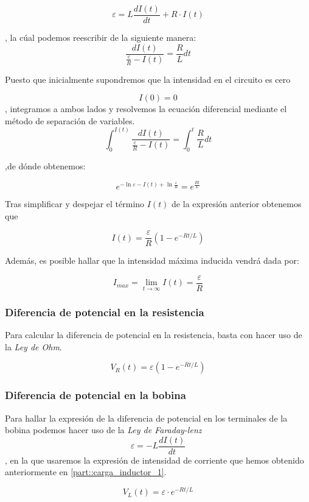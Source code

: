 \documentclass[../main.tex]{subfiles}
\begin{document}
$$\varepsilon = L\frac{d I(t)}{d t} + R \cdot I(t)$$

, la cúal podemos reescribir de la siguiente manera:
$$\frac{d I(t)}{\frac{\varepsilon}{R} - I(t)} = \frac{R}{L} d t$$


Puesto que inicialmente supondremos que la intensidad en el circuito es cero

$$I(0) = 0$$
, integramos a ambos lados y resolvemos la ecuación diferencial mediante el método de separación de variables.
$$\int_0^{I(t)} \frac{d I(t)}{\frac{\varepsilon}{R} - I(t)} = \int_0^t  \frac{R}{L} d t$$

,de dónde obtenemos:

$$e^{-\ln{\varepsilon - I(t)} + \ln{\frac{\varepsilon}{R}}} = e^{\frac{Rt}{L}}$$

Tras simplificar y despejar el término $I(t)$ de la expresión anterior obtenemos que

\begin{equation}
    I(t) = \frac{\varepsilon}{R}\left( 1- e^{-Rt/L}\right)
\end{equation}

Además, es posible hallar que la intensidad máxima inducida vendrá dada por:

$$I_{max} = \lim_{t \to \infty} I(t) = \frac{\varepsilon}{R}$$


\subsubsection{Diferencia de potencial en la resistencia}
\label{part::carga_inductor_2}
Para calcular la diferencia de potencial en la resistencia, basta con hacer uso de la \textit{Ley de Ohm}.

\begin{equation}
    V_R(t) = \varepsilon \left( 1 - e^{-Rt/L}\right)
\end{equation}


\subsubsection{Diferencia de potencial en la bobina}
\label{part::carga_inductor_3}
Para hallar la expresión de la diferencia de potencial en los terminales de la bobina podemos hacer uso de la \textit{Ley de Faraday-lenz}
$$\varepsilon = -L \frac{d I(t)}{d t}$$
, en la que usaremos la expresión de intensidad de corriente que hemos obtenido anteriormente en \ref{part::carga_inductor_1}.

\begin{equation}
    V_L(t) = \varepsilon \cdot e^{-Rt/L}
\end{equation}
\end{document}
